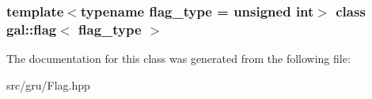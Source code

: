 \subsubsection*{template$<$typename flag\-\_\-type = unsigned int$>$ class gal\-::flag$<$ flag\-\_\-type $>$}



\-The documentation for this class was generated from the following file\-:\begin{DoxyCompactItemize}
\item 
src/gru/\-Flag.\-hpp\end{DoxyCompactItemize}
